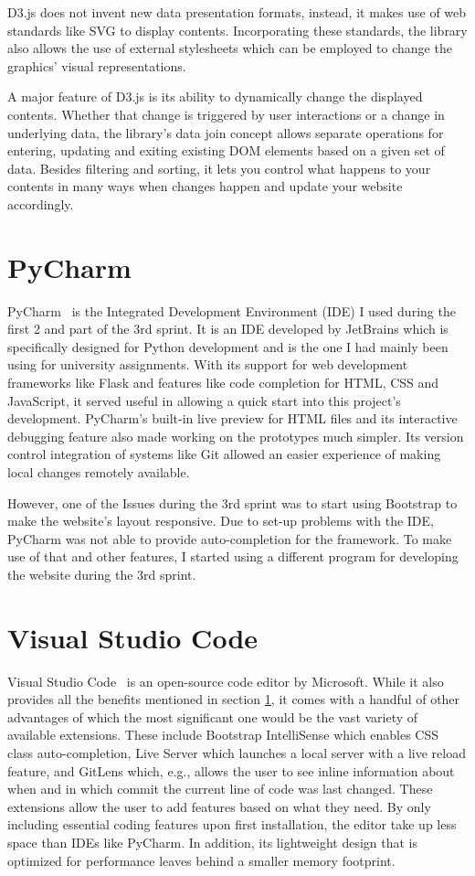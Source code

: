 D3.js does not invent new data presentation formats, instead, it makes use of web standards like SVG to display contents. Incorporating these standards, the library also allows the use of external stylesheets which can be employed to change the graphics' visual representations.

A major feature of D3.js is its ability to dynamically change the displayed contents. Whether that change is triggered by user interactions or a change in underlying data, the library's data join concept allows separate operations for entering, updating and exiting existing DOM elements based on a given set of data. Besides filtering and sorting, it lets you control what happens to your contents in many ways when changes happen and update your website accordingly. 

\section{PyCharm} \label{pycharm}
PyCharm~\cite{pycharm} is the Integrated Development Environment (IDE) I used during the first 2 and part of the 3rd sprint. It is an IDE developed by JetBrains which is specifically designed for Python development and is the one I had mainly been using for university assignments. With its support for web development frameworks like Flask and features like code completion for HTML, CSS and JavaScript, it served useful in allowing a quick start into this project's development.
PyCharm's built-in live preview for HTML files and its interactive debugging feature also made working on the prototypes much simpler.
Its version control integration of systems like Git allowed an easier experience of making local changes remotely available.

However, one of the Issues during the 3rd sprint was to start using Bootstrap to make the website's layout responsive. Due to set-up problems with the IDE, PyCharm was not able to provide auto-completion for the framework. To make use of that and other features, I started using a different program for developing the website during the 3rd sprint.

\section{Visual Studio Code}
Visual Studio Code~\cite{vscode} is an open-source code editor by Microsoft. While it also provides all the benefits mentioned in section \ref{pycharm}, it comes with a handful of other advantages of which the most significant one would be the vast variety of available extensions.
These include Bootstrap IntelliSense which enables CSS class auto-completion, Live Server which launches a local server with a live reload feature, and GitLens which, e.g., allows the user to see inline information about when and in which commit the current line of code was last changed.
These extensions allow the user to add features based on what they need. By only including essential coding features upon first installation, the editor take up less space than IDEs like PyCharm.
In addition, its lightweight design that is optimized for performance leaves behind a smaller memory footprint.

